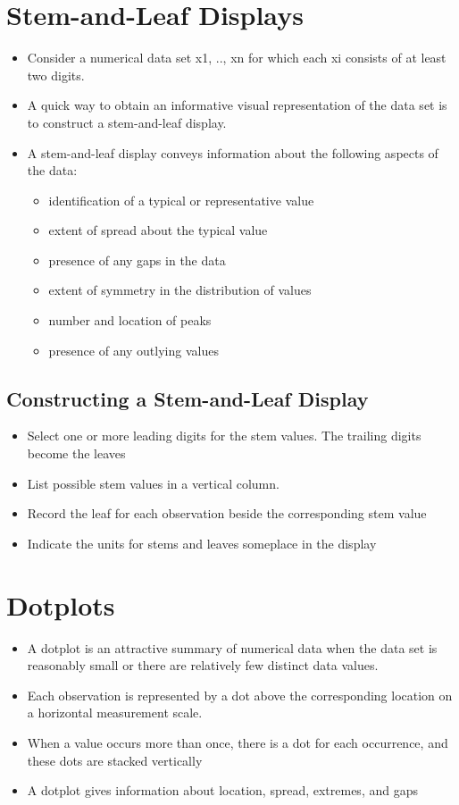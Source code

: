 \section{Stem-and-Leaf Displays \cite{ism-2,wiki-Stem-and-leaf_display}}\label{Stem-and-Leaf Displays}
\begin{itemize}
    \item Consider a numerical data set x1, .., xn for which each xi consists of at least two digits. 
    \item A quick way to obtain an informative visual representation of the data set is to construct a stem-and-leaf display.
    \item A stem-and-leaf display conveys information about the following aspects of the data:
    \begin{itemize}
        \item identification of a typical or representative value
        \item extent of spread about the typical value
        \item presence of any gaps in the data
        \item extent of symmetry in the distribution of values
        \item number and location of peaks
        \item presence of any outlying values
    \end{itemize}
\end{itemize}
\subsection{Constructing a Stem-and-Leaf Display}
\begin{itemize}
    \item Select one or more leading digits for the stem values. The trailing digits become the leaves
    \item List possible stem values in a vertical column.
    \item Record the leaf for each observation beside the corresponding stem value
    \item Indicate the units for stems and leaves someplace in the display
\end{itemize}

\section{Dotplots \cite{wiki-dotplot,ism-2}}\label{dotplots}
\begin{itemize}
    \item A dotplot is an attractive summary of numerical data when the data set is reasonably small or there are relatively few distinct data values. 
    \item Each observation is represented by a dot above the corresponding location on a horizontal measurement scale. 
    \item When a value occurs more than once, there is a dot for each occurrence, and these dots are stacked vertically
    \item A dotplot gives information about location, spread, extremes, and gaps
\end{itemize}

